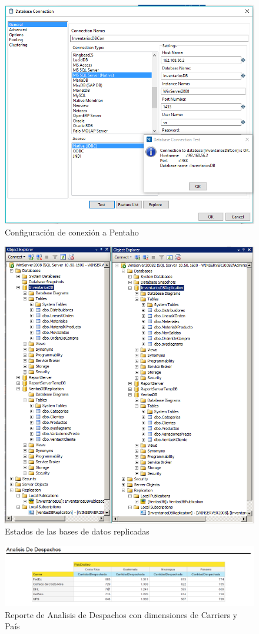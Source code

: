 \documentclass{article}
\begin{document}
\begin{figure}[!ht]
  \caption{Configuraci\'on de conexi\'on a Pentaho}
  \centering
    \includegraphics[width=1\textwidth]{pentahoDBCon1.PNG}
\end{figure}

\begin{figure}[!ht]
  \caption{Estados de las bases de datos replicadas}
  \centering
    \includegraphics[width=1\textwidth]{replicacionFull.PNG}
\end{figure}

\begin{figure}[!ht]
  \caption{Reporte de Analisis de Despachos con dimensiones de Carriers y Pa\'is}
  \centering
    \includegraphics[width=1\textwidth]{analisis.PNG}
\end{figure}
\end{document}
